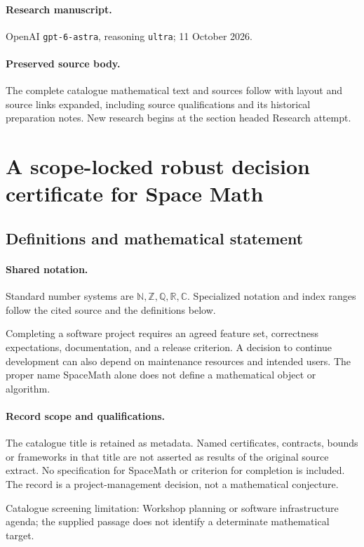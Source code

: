 \documentclass[11pt]{article}
\begin{document}
\paragraph{Research manuscript.} OpenAI \texttt{gpt-6-astra}, reasoning \texttt{ultra}; 11 October 2026.
\paragraph{Preserved source body.} The complete catalogue mathematical text and sources follow with layout and source links expanded, including source qualifications and its historical preparation notes. New research begins at the section headed Research attempt.

\section{A scope-locked robust decision certificate for Space Math}\label{statement}

\subsection{Definitions and mathematical statement}

\paragraph{Shared notation.}Standard number systems are $\mathbb N,\mathbb Z,\mathbb Q,\mathbb R,\mathbb C$. Specialized notation and index ranges follow the cited source and the definitions below.


Completing a software project requires an agreed feature set, correctness expectations, documentation, and a release criterion. A decision to continue development can also depend on maintenance resources and intended users. The proper name SpaceMath alone does not define a mathematical object or algorithm.
\paragraph{Record scope and qualifications.}
The catalogue title is retained as metadata. Named certificates, contracts, bounds or frameworks in that title are not asserted as results of the original source extract.
No specification for SpaceMath or criterion for completion is included. The record is a project-management decision, not a mathematical conjecture.

Catalogue screening limitation: Workshop planning or software infrastructure agenda; the supplied passage does not identify a determinate mathematical target.
\end{document}
